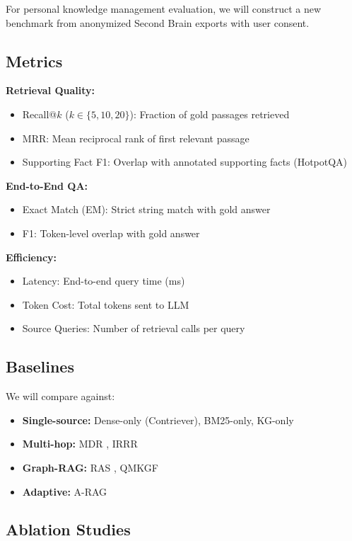\documentclass[11pt,a4paper]{article}
\begin{document}
For personal knowledge management evaluation, we will construct a new benchmark from anonymized Second Brain exports with user consent.

\subsection{Metrics}

\textbf{Retrieval Quality:}
\begin{itemize}
    \item Recall@$k$ ($k \in \{5, 10, 20\}$): Fraction of gold passages retrieved
    \item MRR: Mean reciprocal rank of first relevant passage
    \item Supporting Fact F1: Overlap with annotated supporting facts (HotpotQA)
\end{itemize}

\textbf{End-to-End QA:}
\begin{itemize}
    \item Exact Match (EM): Strict string match with gold answer
    \item F1: Token-level overlap with gold answer
\end{itemize}

\textbf{Efficiency:}
\begin{itemize}
    \item Latency: End-to-end query time (ms)
    \item Token Cost: Total tokens sent to LLM
    \item Source Queries: Number of retrieval calls per query
\end{itemize}

\subsection{Baselines}

We will compare against:
\begin{itemize}
    \item \textbf{Single-source:} Dense-only (Contriever), BM25-only, KG-only
    \item \textbf{Multi-hop:} MDR \citep{xiong2021answering}, IRRR \citep{qi2021answering}
    \item \textbf{Graph-RAG:} RAS \citep{ras2024}, QMKGF \citep{qmkgf2024}
    \item \textbf{Adaptive:} A-RAG \citep{arag2024}
\end{itemize}

\subsection{Ablation Studies}
\end{document}
